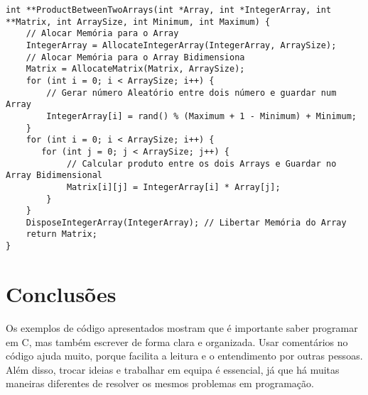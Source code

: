 \begin{lstlisting}[caption=Produto entre o vetor Introduzido e um vetor aleatório., label=chap4:code:10]
int **ProductBetweenTwoArrays(int *Array, int *IntegerArray, int **Matrix, int ArraySize, int Minimum, int Maximum) {
    // Alocar Memória para o Array
    IntegerArray = AllocateIntegerArray(IntegerArray, ArraySize);
    // Alocar Memória para o Array Bidimensiona
    Matrix = AllocateMatrix(Matrix, ArraySize);
    for (int i = 0; i < ArraySize; i++) {
        // Gerar número Aleatório entre dois número e guardar num Array
        IntegerArray[i] = rand() % (Maximum + 1 - Minimum) + Minimum; 
	}
    for (int i = 0; i < ArraySize; i++) {
	   for (int j = 0; j < ArraySize; j++) {
            // Calcular produto entre os dois Arrays e Guardar no Array Bidimensional
            Matrix[i][j] = IntegerArray[i] * Array[j];
        }
    }
    DisposeIntegerArray(IntegerArray); // Libertar Memória do Array
    return Matrix;
}
\end{lstlisting}

\section{Conclusões}
\label{chap4:sec:concs}
Os exemplos de código apresentados mostram que é importante saber programar em C, mas também escrever de forma clara e organizada. Usar comentários no código ajuda muito, porque facilita a leitura e o entendimento por outras pessoas. Além disso, trocar ideias e trabalhar em equipa é essencial, já que há muitas maneiras diferentes de resolver os mesmos problemas em programação.